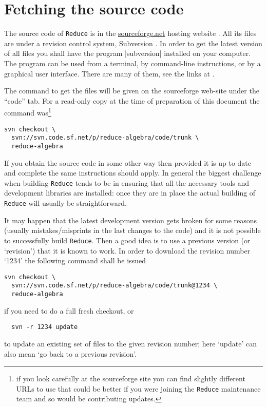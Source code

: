 \documentclass[12pt,twoside,openright]{memoir}
\newcommand{\reduce}{\texttt{Reduce}\xspace}
\begin{document}
\section{Fetching the source code}

The source code of \reduce is in the \url{sourceforge.net} hosting website
\cite{sourceforge}. All its files are under a revision control system,
Subversion \cite{svn}. In order to get the latest version of all files you
shall have the program |subversion| installed on your computer. The program can
be used from a terminal, by command-line instructions, or by a graphical user
interface. There are many of them, see the links at \cite{svn}.

The command to get the files will be given on the sourceforge web-site under the
``code'' tab. For a read-only copy at the time of preparation of this document
the command was\footnote{if you look carefully at the sourceforge site you can
  find slightly different URLs to use that could be better if you were joining
  the \reduce maintenance team and so would be contributing updates.}
\begin{verbatim}
svn checkout \
  svn://svn.code.sf.net/p/reduce-algebra/code/trunk \
  reduce-algebra
\end{verbatim}
If you obtain the source code in some other way then provided it is up to date
and complete the same instructions should apply. In general the biggest
challenge when building \reduce tends to be in ensuring that all the necessary
tools and development libraries are installed: once they are in place the
actual building of \reduce will usually be straightforward.

It may happen that the latest development version gets broken for some reasons
(usually mistakes/misprints in the last changes to the code) and it is not
possible to successfully build \reduce. Then a good idea is to use a previous
version (or `revision') that it is known to work. In order to download the
revision number `1234' the following command shall be issued
\begin{verbatim}
svn checkout \
  svn://svn.code.sf.net/p/reduce-algebra/code/trunk@1234 \
  reduce-algebra
\end{verbatim}
if you need to do a full fresh checkout, or
\begin{verbatim}
  svn -r 1234 update
\end{verbatim}
to update an existing set of files to the given revision number; here `update'
can also mean `go back to a previous revision'.
\end{document}
